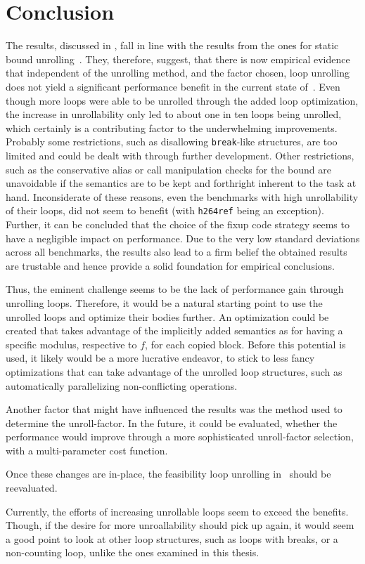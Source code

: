 \chapter{Conclusion}\label{sec:conclusion}

The results, discussed in , fall in line with the results from the ones for static bound unrolling~\cite{aebi18bachelorarbeit}.
They, therefore, suggest, that there is now empirical evidence that independent of the unrolling method, and the factor chosen, loop unrolling does not yield a significant performance benefit in the current state of~\libFIRM.
Even though more loops were able to be unrolled through the added loop optimization, the increase in unrollability only led to about one in ten loops being unrolled, which certainly is a contributing factor to the underwhelming improvements.
Probably some restrictions, such as disallowing \texttt{break}-like structures, are too limited and could be dealt with through further development.
Other restrictions, such as the conservative alias or call manipulation checks for the bound are unavoidable if the semantics are to be kept and forthright inherent to the task at hand.
Inconsiderate of these reasons, even the benchmarks with high unrollability of their loops, did not seem to benefit (with \texttt{h264ref} being an exception).
Further, it can be concluded that the choice of the fixup code strategy seems to have a negligible impact on performance.
Due to the very low standard deviations across all benchmarks, the results also lead to a firm belief the obtained results are trustable and hence provide a solid foundation for empirical conclusions.

Thus, the eminent challenge seems to be the lack of performance gain through unrolling loops.
Therefore, it would be a natural starting point to use the unrolled loops and optimize their bodies further.
An optimization could be created that takes advantage of the implicitly added semantics as for having a specific modulus, respective to $f$, for each copied block.
Before this potential is used, it likely would be a more lucrative endeavor, to stick to less fancy optimizations that can take advantage of the unrolled loop structures, such as automatically parallelizing non-conflicting operations.

Another factor that might have influenced the results was the method used to determine the unroll-factor.
In the future, it could be evaluated, whether the performance would improve through a more sophisticated unroll-factor selection, with a multi-parameter cost function.

Once these changes are in-place, the feasibility loop unrolling in~\libFIRM{} should be reevaluated.

Currently, the efforts of increasing unrollable loops seem to exceed the benefits.
Though, if the desire for more unroallability should pick up again, it would seem a good point to look at other loop structures, such as loops with breaks, or a non-counting loop, unlike the ones examined in this thesis.
